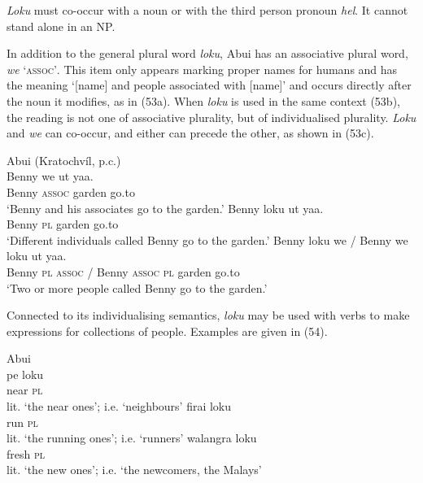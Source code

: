 \textit{Loku} must co-occur with a noun or with the third person pronoun \textit{hel}. It cannot stand alone in an NP.

In addition to the general plural word \textit{loku}, Abui has an associative plural word, \textit{we} `\textsc{assoc'}. This item only appears marking proper names for humans and has the meaning `[name] and people associated with [name]' and occurs directly after the noun it modifies, as in (53a). When \textit{loku} is used in the same context (53b), the reading is not one of associative plurality, but of individualised plurality. \textit{Loku} and \textit{we} can co-occur, and either can precede the other, as shown in (53c).




\ea%
\label{ex:53}
\ea
Abui (Kratochv\'il, p.c.)\\
\gll Benny w{e} ut yaa. \\
   Benny \textsc{assoc} garden go.to  \\
\glt `Benny and his associates go to the garden.'
\ex
\gll Benny loku ut yaa. \\
   Benny \textsc{pl} garden go.to  \\
\glt `Different individuals called Benny go to the garden.'
\ex
\gll Benny loku we / Benny  we loku ut yaa.\\
    Benny \textsc{pl}  \textsc{assoc} / Benny \textsc{assoc} \textsc{pl} garden go.to\\
\glt  `Two or more people called Benny go to the garden.'
\z
\z






Connected to its individualising semantics, \textit{loku} may be used with verbs to make expressions for collections of people. Examples are given in (54).


\ea%
\label{ex:54}
\ea
Abui \citep[155]{Kratochvil2007}\\
\gll pe loku  \\
   near \textsc{pl}  \\
\glt lit. `the near ones'; i.e. `neighbours'
\ex
\gll firai loku \\
  run \textsc{pl}   \\
 \glt lit. `the running ones'; i.e. `runners'
\glt
\ex
\gll walangra loku \\
   fresh \textsc{pl}  \\
\glt  lit. `the new ones'; i.e. `the newcomers, the Malays'
\z
\z






